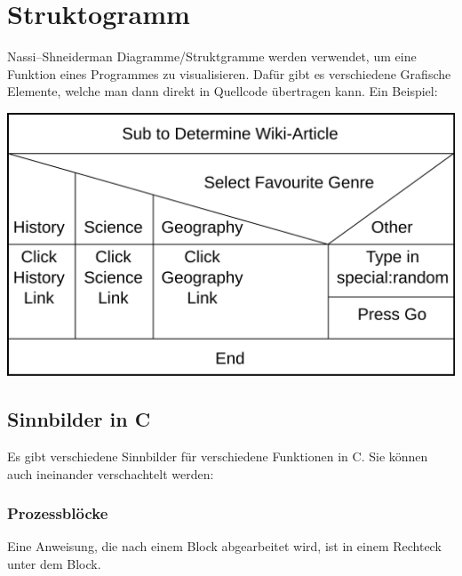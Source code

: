 \section{Struktogramm}

Nassi–Shneiderman Diagramme/Struktgramme werden verwendet, um eine Funktion eines Programmes zu visualisieren. Dafür gibt es verschiedene Grafische Elemente, welche man dann direkt in Quellcode übertragen kann.\newline
Ein Beispiel:\newline

\includegraphics[width=1\columnwidth]{Pictures/Struktogramm_bsp.png}

\subsection{Sinnbilder in C}

Es gibt verschiedene Sinnbilder für verschiedene Funktionen in C. Sie können auch ineinander verschachtelt werden:

\subsubsection{Prozessblöcke}

Eine Anweisung, die nach einem Block abgearbeitet wird, ist in einem Rechteck unter dem Block. \newline

